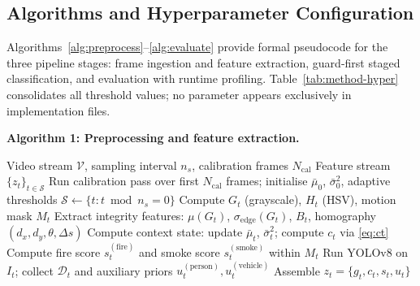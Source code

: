 \documentclass[sensors,article,submit,pdftex,moreauthors]{Definitions/mdpi}
\begin{document}
\subsection{Algorithms and Hyperparameter Configuration}
 
Algorithms~\ref{alg:preprocess}--\ref{alg:evaluate} provide formal pseudocode for the three pipeline stages: frame ingestion and feature extraction, guard-first staged classification, and evaluation with runtime profiling. Table~\ref{tab:method-hyper} consolidates all threshold values; no parameter appears exclusively in implementation files.
 
\noindent\textbf{Algorithm 1: Preprocessing and feature extraction.}
\begin{algorithm}[H]
\caption{Preprocessing and Feature Extraction}
\label{alg:preprocess}
\begin{algorithmic}[1]
\Require Video stream $\mathcal{V}$, sampling interval $n_s$, calibration frames $N_{\text{cal}}$
\Ensure Feature stream $\{z_t\}_{t \in \mathcal{S}}$
\State Run calibration pass over first $N_{\text{cal}}$ frames; initialise $\bar{\mu}_0$, $\bar{\sigma}_0^2$, adaptive thresholds
\State $\mathcal{S} \leftarrow \{t : t \bmod n_s = 0\}$
    \State Compute $G_t$ (grayscale), $H_t$ (HSV), motion mask $M_t$
    \State Extract integrity features: $\mu(G_t)$, $\sigma_{\text{edge}}(G_t)$, $B_t$, homography $(d_x,d_y,\theta,\Delta s)$
    \State Compute context state: update $\bar{\mu}_t$, $\bar{\sigma}_t^2$; compute $c_t$ via \eqref{eq:ct}
    \State Compute fire score $s_t^{(\text{fire})}$ and smoke score $s_t^{(\text{smoke})}$ within $M_t$
    \State Run YOLOv8 on $I_t$; collect $\mathcal{D}_t$ and auxiliary priors $u_t^{(\text{person})}, u_t^{(\text{vehicle})}$
    \State Assemble $z_t = \{g_t, c_t, s_t, u_t\}$
\EndFor
\end{algorithmic}
\end{algorithm}
 
\end{document}
